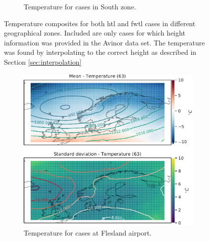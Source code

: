 \begin{figure}[H]
\begin{subfigure}[b]{0.49\textwidth}
    \caption{Temperature for cases in South zone.}
    \label{fig:SouthTemperature}
\end{subfigure}
\caption{Temperature composites for both \acrshort{htl} and \acrshort{fwtl} cases in different geographical zones. Included are only cases for which height information was provided in the Avinor data set. The temperature was found by interpolating to the correct height as described in Section \ref{sec:interpolation}}
\label{fig:tempzones}
\end{figure}

\begin{figure}[H]
     \centering
     \begin{subfigure}[b]{0.49\textwidth}
         \centering
         \includegraphics[width=\textwidth]{Figures/TempENBR.pdf}
         \caption{Temperature for cases at Flesland airport.}
         \label{fig:ENBRTemperature}
     \end{subfigure}
     \hfill
     \begin{subfigure}[b]{0.49\textwidth}
         \centering

\end{subfigure}
\end{figure}
